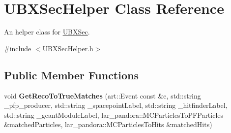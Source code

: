 \hypertarget{classUBXSecHelper}{\section{\-U\-B\-X\-Sec\-Helper \-Class \-Reference}
\label{classUBXSecHelper}
}


\-An helper class for \hyperlink{classUBXSec}{\-U\-B\-X\-Sec}.  




{\ttfamily \#include $<$\-U\-B\-X\-Sec\-Helper.\-h$>$}

\subsection*{\-Public \-Member \-Functions}
\begin{DoxyCompactItemize}
\item 
\hypertarget{classUBXSecHelper_a0bc1ff387b79732ea8d365ad296a22fb}{void {\bfseries \-Get\-Reco\-To\-True\-Matches} (art\-::\-Event const \&e, std\-::string \-\_\-pfp\-\_\-producer, std\-::string \-\_\-spacepoint\-Label, std\-::string \-\_\-hitfinder\-Label, std\-::string \-\_\-geant\-Module\-Label, lar\-\_\-pandora\-::\-M\-C\-Particles\-To\-P\-F\-Particles \&matched\-Particles, lar\-\_\-pandora\-::\-M\-C\-Particles\-To\-Hits \&matched\-Hits)}\label{classUBXSecHelper_a0bc1ff387b79732ea8d365ad296a22fb}

\end{DoxyCompactItemize}
